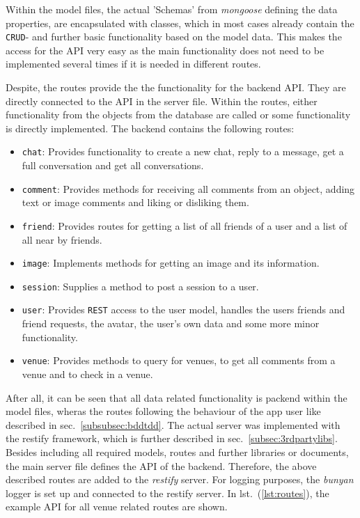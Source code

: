Within the model files, the actual 'Schemas' from \textit{mongoose} defining the data properties, are encapsulated with classes, which in most cases already contain the \texttt{CRUD}- and further basic functionality based on the model data. This makes the access for the API very easy as the main functionality does not need to be implemented several times if it is needed in different routes. 

Despite, the routes provide the the functionality for the backend API. They are directly connected to the API in the server file. Within the routes, either functionality from the objects from the database are called or some functionality is directly implemented. The backend contains the following routes:
\begin{itemize}
	\item \texttt{chat}: Provides functionality to create a new chat, reply to a message, get a full conversation and get all conversations.
	\item \texttt{comment}: Provides methods for receiving all comments from an object, adding text or image comments and liking or disliking them.
	\item \texttt{friend}: Provides routes for getting a list of all friends of a user and a list of all near by friends.
	\item \texttt{image}: Implements methods for getting an image and its information.
	\item \texttt{session}: Supplies a method to post a session to a user.
	\item \texttt{user}: Provides \texttt{REST} access to the user model, handles the users friends and friend requests, the avatar, the user's own data and some more minor functionality. 
	\item \texttt{venue}: Provides methods to query for venues, to get all comments from a venue and to check in a venue.
	
\end{itemize} 
After all, it can be seen that all data related functionality is packend within the model files, wheras the routes following the behaviour of the app user like described in sec.\ \ref{subsubsec:bddtdd}.
\newline\newline
The actual server was implemented with the restify framework, which is further described in sec.\ \ref{subsec:3rdpartylibs}. Besides including all required models, routes and further libraries or documents, the main server file defines the API of the backend. Therefore, the above described routes are added to the \textit{restify} server. For logging purposes, the \textit{bunyan} logger is set up and connected to the restify server. In lst.\ (\ref{lst:routes}),  the example API for all venue related routes are shown.

